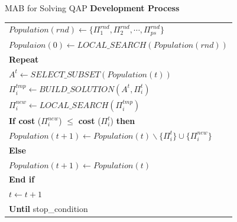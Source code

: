 \documentclass{beamer}
\begin{document}
\begin{frame}[t]{MAB for Solving QAP} %
\textbf{Development Process}
\footnotesize
\begin{center}
\begin{tabular}{ l }
$Population(rnd)\leftarrow\{\Pi_{1}^{rnd},\Pi_{2}^{rnd},\cdots,\Pi_{ps}^{rnd}\}$\\ 
$Populaion(0)\leftarrow LOCAL\_SEARCH(Population(rnd))$\\  
\textbf{Repeat}\\
\quad $A^t\leftarrow SELECT\_SUBSET(Population(t))$\\
\quad $\Pi_{i}^{tmp}\leftarrow BUILD\_SOLUTION(A^t,\Pi_{i}^{t})$\\
\quad $\Pi_{i}^{new}\leftarrow LOCAL\_SEARCH(\Pi_{i}^{tmp})$\\  
\quad \textbf{If cost} ($\Pi_{i}^{new}$) $\leq$ \textbf{cost} ($\Pi_{i}^{t}$) \textbf{then}\\
\quad $Population(t+1)\leftarrow Population(t) \backslash \{\Pi_{i}^{t}\} \cup \{\Pi_{i}^{new}\}$\\
\quad \textbf{Else}\\
\quad $Population(t+1) \leftarrow Population(t)$\\
\quad \textbf{End if}\\
\quad $t \leftarrow t+1$\\
\textbf{Until} stop\_condition
\end{tabular}
\end{center}
\end{frame}
\end{document}
